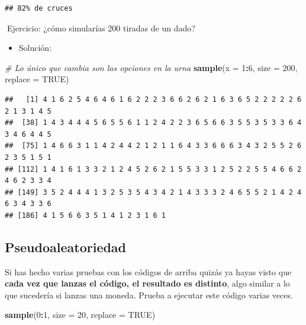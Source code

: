 \documentclass[11pt,]{book}
\newenvironment{Shaded}{\begin{snugshade}}{\end{snugshade}}
\newcommand{\CommentTok}[1]{\textcolor[rgb]{0.37,0.37,0.37}{\textit{#1}}}
\newcommand{\DataTypeTok}[1]{\textcolor[rgb]{0.27,0.27,0.27}{#1}}
\newcommand{\DecValTok}[1]{\textcolor[rgb]{0.06,0.06,0.06}{#1}}
\newcommand{\KeywordTok}[1]{\textcolor[rgb]{0.27,0.27,0.27}{\textbf{#1}}}
\newcommand{\NormalTok}[1]{#1}
\newcommand{\OperatorTok}[1]{\textcolor[rgb]{0.43,0.43,0.43}{\textbf{#1}}}
\newcommand{\OtherTok}[1]{\textcolor[rgb]{0.37,0.37,0.37}{#1}}
\providecommand{\tightlist}{%
  \setlength{\itemsep}{0pt}\setlength{\parskip}{0pt}}
\begin{document}
\begin{verbatim}
## 82% de cruces
\end{verbatim}

📝Ejercicio: ¿cómo simularías 200 tiradas de un dado?

\begin{itemize}
\tightlist
\item
  Solución:
\end{itemize}

\begin{Shaded}
\begin{Highlighting}[]
\CommentTok{# Lo único que cambia son las opciones en la urna}
\KeywordTok{sample}\NormalTok{(}\DataTypeTok{x =} \DecValTok{1}\OperatorTok{:}\DecValTok{6}\NormalTok{, }\DataTypeTok{size =} \DecValTok{200}\NormalTok{, }\DataTypeTok{replace =} \OtherTok{TRUE}\NormalTok{)}
\end{Highlighting}
\end{Shaded}

\begin{verbatim}
##   [1] 4 1 6 2 5 4 6 4 6 1 6 2 2 2 3 6 6 2 6 2 1 6 3 6 5 2 2 2 2 2 6 2 1 3 1 4 5
##  [38] 1 4 3 4 4 4 5 6 5 5 6 1 1 2 4 2 2 3 6 5 6 6 3 5 5 3 5 3 3 6 4 3 4 6 4 4 5
##  [75] 1 4 6 6 3 1 1 4 2 4 4 2 1 2 1 1 6 4 3 3 6 6 6 3 4 3 2 5 5 2 6 2 3 5 1 5 1
## [112] 1 4 1 6 1 3 3 2 1 2 4 5 2 6 2 1 5 5 3 3 1 2 5 2 2 5 5 4 6 6 2 4 6 2 3 3 4
## [149] 3 5 2 4 4 4 1 3 2 5 3 5 4 3 4 2 1 4 3 3 3 2 4 6 5 5 2 1 4 2 4 6 3 4 3 3 6
## [186] 4 1 5 6 6 3 5 1 4 1 2 3 1 6 1
\end{verbatim}

\hypertarget{pseudoaleatorio}{%
\subsection{Pseudoaleatoriedad}\label{pseudoaleatorio}}

Si has hecho varias pruebas con los códigos de arriba quizás ya hayas visto que \textbf{cada vez que lanzas el código, el resultado es distinto}, algo similar a lo que sucedería si lanzas una moneda. Prueba a ejecutar este código varias veces.

\begin{Shaded}
\begin{Highlighting}[]
\KeywordTok{sample}\NormalTok{(}\DecValTok{0}\OperatorTok{:}\DecValTok{1}\NormalTok{, }\DataTypeTok{size =} \DecValTok{20}\NormalTok{, }\DataTypeTok{replace =} \OtherTok{TRUE}\NormalTok{)}
\end{Highlighting}
\end{Shaded}
\end{document}
